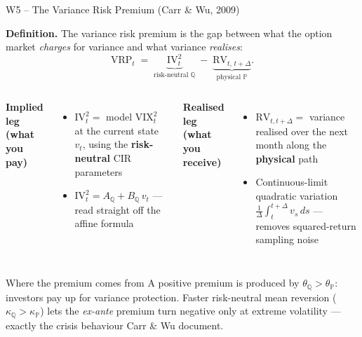 \documentclass[aspectratio=169, 11pt]{beamer}
\begin{document}
\begin{frame}{W5 -- The Variance Risk Premium (Carr \& Wu, 2009)}

\textbf{Definition.}\; The variance risk premium is the gap between what the option
market \textit{charges} for variance and what variance \textit{realises}:
\[
  \mathrm{VRP}_t \;=\; \underbrace{\mathrm{IV}_t^2}_{\text{risk-neutral } \mathbb{Q}}
  \;-\; \underbrace{\mathrm{RV}_{t,\,t+\Delta}}_{\text{physical } \mathbb{P}}.
\]

\begin{columns}[T]
\textbf{Implied leg (what you pay)}
\begin{itemize}
  \item $\mathrm{IV}_t^2 = $ model $\mathrm{VIX}_t^2$ at the current state $v_t$, using the
        \textbf{risk-neutral} CIR parameters
  \item $\mathrm{IV}_t^2 = A_{\mathbb{Q}} + B_{\mathbb{Q}}\,v_t$ --- read straight off the affine formula
\end{itemize}

\textbf{Realised leg (what you receive)}
\begin{itemize}
  \item $\mathrm{RV}_{t,t+\Delta} = $ variance realised over the next month along the
        \textbf{physical} path
  \item Continuous-limit quadratic variation $\tfrac{1}{\Delta}\!\int_t^{t+\Delta} v_s\,ds$
        --- removes squared-return sampling noise
\end{itemize}
\end{columns}

\vspace{6pt}
\begin{block}{Where the premium comes from}
\small
A positive premium is produced by $\theta_{\mathbb{Q}} > \theta_{\mathbb{P}}$: investors pay
up for variance protection. Faster risk-neutral mean reversion
($\kappa_{\mathbb{Q}} > \kappa_{\mathbb{P}}$) lets the \textit{ex-ante} premium turn negative
only at extreme volatility --- exactly the crisis behaviour Carr \& Wu document.
\end{block}
\end{frame}
\end{document}

